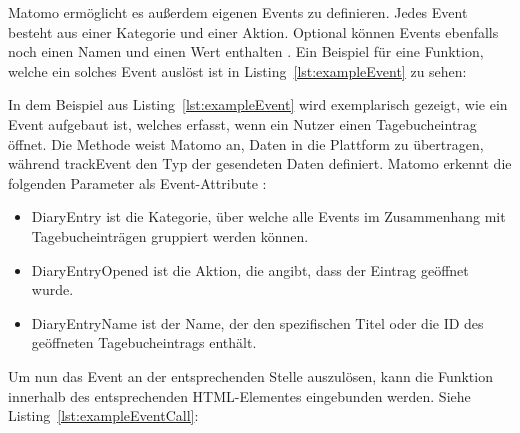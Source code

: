 Matomo ermöglicht es außerdem eigenen Events zu definieren. Jedes Event besteht aus einer Kategorie und einer Aktion. Optional können Events ebenfalls noch einen Namen und einen Wert enthalten \parencite{MatomoEvent}. Ein Beispiel für eine Funktion, welche ein solches Event auslöst ist in Listing~\ref{lst:exampleEvent} zu sehen: 

\begin{figure}[H]
    \centering
    \begin{minipage}{\textwidth}
        
    \end{minipage}
\end{figure}

In dem Beispiel aus Listing~\ref{lst:exampleEvent} wird exemplarisch gezeigt, wie ein Event aufgebaut ist, welches erfasst, wenn ein Nutzer einen Tagebucheintrag öffnet. Die Methode \texttt{} weist Matomo an, Daten in die Plattform zu übertragen, während \glqq trackEvent\grqq{} den Typ der gesendeten Daten definiert. Matomo erkennt die folgenden Parameter als Event-Attribute \parencite{MatomoEvent}:

\begin{itemize}
    \item  \glqq DiaryEntry\grqq{} ist die Kategorie, über welche alle Events im Zusammenhang mit Tagebucheinträgen gruppiert werden können.
    \item \glqq DiaryEntryOpened\grqq{} ist die Aktion, die angibt, dass der Eintrag geöffnet wurde.
    \item \glqq DiaryEntryName\grqq{} ist der Name, der den spezifischen Titel oder die ID des geöffneten Tagebucheintrags enthält.
\end{itemize}

Um nun das Event an der entsprechenden Stelle auszulösen, kann die Funktion innerhalb des entsprechenden HTML-Elementes eingebunden werden. Siehe Listing~\ref{lst:exampleEventCall}: 

\begin{figure}[H]
    \centering
    \begin{minipage}{\textwidth}
        
    \end{minipage}
\end{figure}

